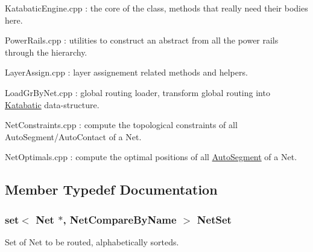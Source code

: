 \begin{DoxyItemize}
\item {\ttfamily Katabatic\-Engine.\-cpp} \-: the core of the class, methods that really need their bodies here.
\item {\ttfamily Power\-Rails.\-cpp} \-: utilities to construct an abstract from all the power rails through the hierarchy.
\item {\ttfamily Layer\-Assign.\-cpp} \-: layer assignement related methods and helpers.
\item {\ttfamily Load\-Gr\-By\-Net.\-cpp} \-: global routing loader, transform global routing into \hyperlink{namespaceKatabatic}{Katabatic} data-\/structure.
\item {\ttfamily Net\-Constraints.\-cpp} \-: compute the topological constraints of all Auto\-Segment/\-Auto\-Contact of a Net.
\item {\ttfamily Net\-Optimals.\-cpp} \-: compute the optimal positions of all \hyperlink{classKatabatic_1_1AutoSegment}{Auto\-Segment} of a Net. 
\end{DoxyItemize}

\subsection{Member Typedef Documentation}
\hypertarget{classKatabatic_1_1KatabaticEngine_a92ed88f9aecd2f195089c4029fa8bcc7}{
\subsubsection[{Net\-Set}]{\setlength{\rightskip}{0pt plus 5cm}set$<$ {\bf Net} $\ast$, Net\-Compare\-By\-Name $>$ {\bf Net\-Set}}}\label{classKatabatic_1_1KatabaticEngine_a92ed88f9aecd2f195089c4029fa8bcc7}
Set of Net to be routed, alphabetically sorteds. 

